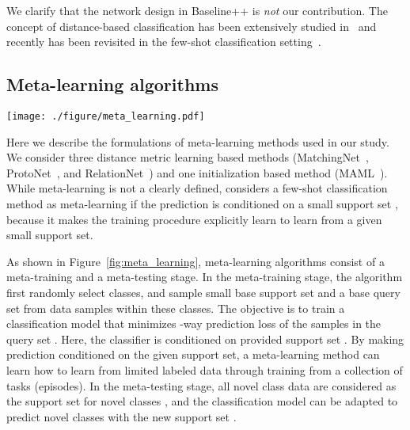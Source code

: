 \documentclass{article}
\newlength\secmargin
\newcommand{\figref}[1]{Figure~\ref{fig:#1}}
\begin{document}
We clarify that the network design in Baseline++ is \emph{not} our contribution. The concept of distance-based classification has been extensively studied in~\cite{mensink2012metric} and recently has been revisited in the few-shot classification setting~\cite{gidaris2018dynamic,qi2018low}. 


\vspace{\secmargin}
\subsection{Meta-learning algorithms}
\label{sec:meta-learning}
\begin{figure*}[t]
\texttt{[image: ./figure/meta\_learning.pdf]}
\caption{\textbf{Meta-learning few-shot classification algorithms.} The meta-learning classifier  is conditioned on the support set . (\emph{Top}) In the meta-train stage, the support set  and the query set  are first sampled from random  classes, and then train the parameters in  to minimize the -way prediction loss . In the meta-testing stage, the adapted classifier  can predict novel classes with the support set in the novel classes . (\emph{Bottom}) The design of  in different meta-learning algorithms.}
\label{fig:meta_learning}
\end{figure*} Here we describe the formulations of meta-learning methods used in our study. We consider three distance metric learning based methods (MatchingNet~\cite{vinyals2016matching}, ProtoNet~\cite{snell2017prototypical}, and RelationNet~\cite{sung2018learning}) and one initialization based method (MAML~\cite{finn2017model}). While meta-learning is not a clearly defined, \cite{vinyals2016matching} considers a few-shot classification method as meta-learning if the prediction is conditioned on a small support set , because it makes the training procedure explicitly learn to learn from a given small support set. 

As shown in \figref{meta_learning}, meta-learning algorithms consist of a meta-training and a meta-testing stage. In the meta-training stage, the algorithm first randomly select  classes, and sample small base support set  and a base query set  from data samples within these classes. The objective is to train a classification model  that minimizes -way prediction loss  of the samples in the query set . 
Here, the classifier  is conditioned on provided support set . 
By making prediction conditioned on the given support set, a meta-learning method can learn how to learn from limited labeled data through training from a collection of tasks (episodes). In the meta-testing stage, all novel class data  are considered as the support set for novel classes , and the classification model  can be adapted to predict novel classes with the new support set . 
\end{document}
